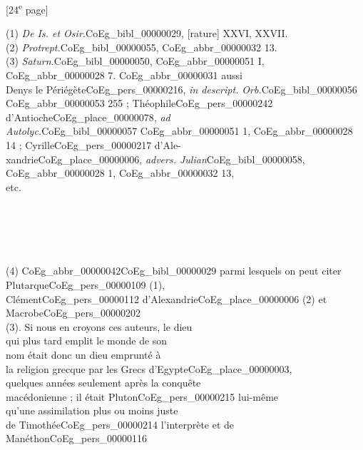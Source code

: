 \documentclass{book}
\begin{document}
{{\footnotesize\begin{center} {[24\textsuperscript{e} page]}\end{center}}

\begin{paracol}{2}
\noindent (1) \textit{De Is. et Osir.}\gls{CoEg_bibl_00000029}, [rature] XXVI, XXVII.\\
(2) \textit{Protrept.}\gls{CoEg_bibl_00000055}, \gls{CoEg_abbr_00000032} 13.\\
(3) \textit{Saturn.}\gls{CoEg_bibl_00000050}, \gls{CoEg_abbr_00000051} I, \gls{CoEg_abbr_00000028} 7. \Gls{CoEg_abbr_00000031} aussi\\
Denys le Périégète\gls{CoEg_pers_00000216}, \textit{in descript. Orb.}\gls{CoEg_bibl_00000056}\\
\gls{CoEg_abbr_00000053} 255 ; Théophile\gls{CoEg_pers_00000242} d’Antioche\gls{CoEg_place_00000078}, \textit{ad\\
Autolyc.}\gls{CoEg_bibl_00000057} \gls{CoEg_abbr_00000051} 1, \gls{CoEg_abbr_00000028} 14 ; Cyrille\gls{CoEg_pers_00000217} d’Ale-\\
xandrie\gls{CoEg_place_00000006}, \textit{advers. Julian}\gls{CoEg_bibl_00000058}, \gls{CoEg_abbr_00000028} 1, \gls{CoEg_abbr_00000032} 13,\\
etc.\\
\\
\\
\\
\\
\\
(4) \Gls{CoEg_abbr_00000042}\gls{CoEg_bibl_00000029}
\switchcolumn \noindent parmi lesquels on peut citer Plutarque\gls{CoEg_pers_00000109} (1),\\
Clément\gls{CoEg_pers_00000112} d’Alexandrie\gls{CoEg_place_00000006} (2) et Macrobe\gls{CoEg_pers_00000202}\\
(3). Si nous en croyons ces auteurs, le dieu\\
qui plus tard emplit le monde de son\\
nom était donc un dieu emprunté à\\
la religion grecque par les Grecs d’Egypte\gls{CoEg_place_00000003},\\
quelques années seulement après la conquête\\
macédonienne ; il était Pluton\gls{CoEg_pers_00000215} lui-même\\
qu’une assimilation plus ou moins juste\\
de Timothée\gls{CoEg_pers_00000214} l’interprète et de Manéthon\gls{CoEg_pers_00000116}\\

\end{paracol}}
\end{document}
